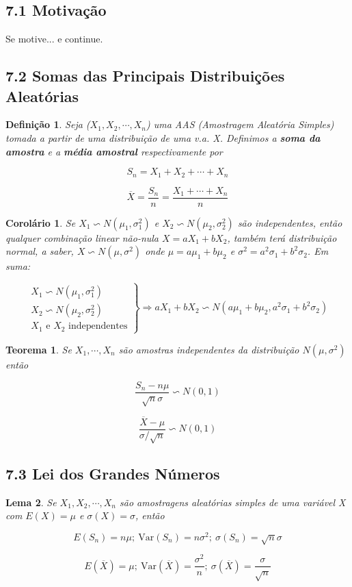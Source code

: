 \documentclass[12pt]{article}
\newtheorem{theorem}{Teorema}[section]
\newtheorem{corollary}{Corolário}[theorem]
\newtheorem{lemma}[theorem]{Lema}
\newtheorem{definition}{Definição}
\begin{document}
\subsection*{7.1 Motivação}
Se motive... e continue.

\subsection*{7.2 Somas das Principais Distribuições Aleatórias}
\begin{definition}
    Seja ($X_1, X_2, \cdots, X_n$) uma AAS (Amostragem Aleatória Simples) tomada a partir de uma distribuição de uma v.a. X. Definimos a \textbf{soma da amostra} e a \textbf{média amostral} respectivamente por
    
    $$S_n = X_1 + X_2 + \cdots + X_n$$
    
    $$\overline{X} = \frac{S_n}{n} = \frac{X_1 + \cdots + X_n}{n}$$
\end{definition}

\begin{corollary}
    Se $X_1 \backsim N(\mu_1, \sigma_1^2)$ e $X_2 \backsim N(\mu_2, \sigma_2^2)$ são independentes, então qualquer combinação linear não-nula $X = a X_1 + b X_2$, também terá distribuição normal, a saber, $X \backsim N(\mu, \sigma^2)$ onde $\mu = a \mu_1 + b \mu_2$ e $\sigma^2 = a^2 \sigma_1 + b^2 \sigma_2$. Em suma:
    
    $$
    \left . \begin{array}{lll}
        X_1 \backsim N (\mu_1, \sigma_1^2) \\
        X_2 \backsim N (\mu_2, \sigma_2^2) \\
        X_1 \text{ e } X_2 \text{ independentes}
    \end{array} \right \} \Rightarrow a X_1 + b X_2 \backsim N(a \mu_1 + b \mu_2, a^2 \sigma_1 + b^2 \sigma_2)
    $$
\end{corollary}

\begin{theorem}
    Se $X_1, \cdots, X_n$ são amostras independentes da distribuição $N(\mu, \sigma^2)$ então
    
    $$\frac{S_n - n \mu}{\sqrt{n} \sigma} \backsim N(0, 1)$$
    
    $$\frac{\overline{X} - \mu}{\sigma / \sqrt{n}} \backsim N(0, 1)$$
\end{theorem}

\subsection*{7.3 Lei dos Grandes Números}
\begin{lemma}
Se $X_1, X_2, \cdots, X_n$ são amostragens aleatórias simples de uma variável X com $E(X) = \mu$ e $\sigma(X) = \sigma$, então

$$E(S_n) = n \mu; \ \text{Var}(S_n) = n \sigma^2; \ \sigma(S_n) = \sqrt{n} \sigma$$

$$E(\overline{X}) = \mu; \ \text{Var}(\overline{X}) = \frac{\sigma^2}{n}; \ \sigma(\overline{X}) = \frac{\sigma}{\sqrt{n}}$$
\end{lemma}
\end{document}
